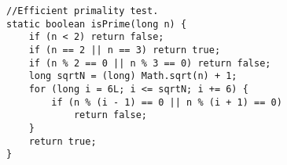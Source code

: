 \begin{verbatim}
//Efficient primality test.
static boolean isPrime(long n) {
	if (n < 2) return false;
	if (n == 2 || n == 3) return true;
	if (n % 2 == 0 || n % 3 == 0) return false;
	long sqrtN = (long) Math.sqrt(n) + 1;
	for (long i = 6L; i <= sqrtN; i += 6) {
		if (n % (i - 1) == 0 || n % (i + 1) == 0)
			return false;
	}
	return true;
}
\end{verbatim}